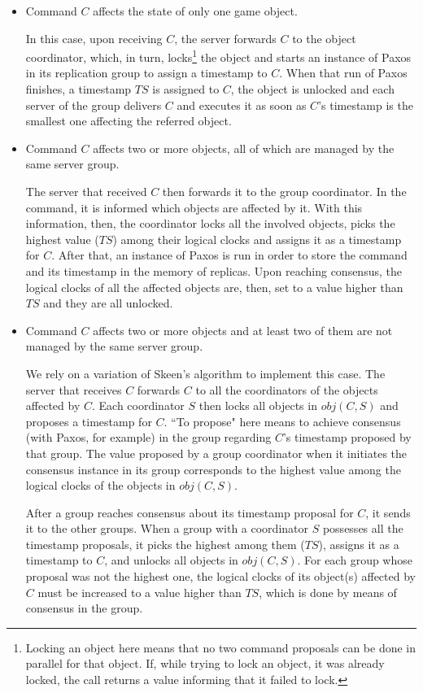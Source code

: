 \documentclass[times, 10pt]{article}
\begin{document}
\begin{itemize}
\item Command $C$ affects the state of only one game object.

In this case, upon receiving $C$, the server forwards $C$ to the object coordinator, which, in turn, locks\footnote{Locking an object here means that no two command proposals can be done in parallel for that object. If, while trying to lock an object, it was already locked, the  call returns a value informing that it failed to lock.} the object and starts an instance of Paxos in its replication group to assign a timestamp to $C$. When that run of Paxos finishes, a timestamp $TS$ is assigned to $C$, the object is unlocked and each server of the group delivers $C$ and executes it as soon as $C$'s timestamp is the smallest one affecting the referred object.

\item Command $C$ affects two or more objects, all of which are managed by the same server group.

The server that received $C$ then forwards it to the group coordinator. In the command, it is informed which objects are affected by it. With this information, then, the coordinator locks all the involved objects, picks the highest value ($TS$) among their logical clocks and assigns it as a timestamp for $C$. After that, an instance of Paxos is run in order to store the command and its timestamp in the memory of replicas. Upon reaching consensus, the logical clocks of all the affected objects are, then, set to a value higher than $TS$ and they are all unlocked.

\item Command $C$ affects two or more objects and at least two of them are not managed by the same server group.


We rely on a variation of Skeen's algorithm to implement this case. The server that receives $C$ forwards $C$ to all the coordinators of the objects affected by $C$. Each coordinator $S$ then locks all objects in $obj(C,S)$ and proposes a timestamp for $C$. ``To propose" here means to achieve consensus (with Paxos, for example) in the group regarding $C$'s timestamp proposed by that group. The value proposed by a group coordinator when it initiates the consensus instance in its group corresponds to the highest value among the logical clocks of the objects in $obj(C,S)$.

After a group reaches consensus about its timestamp proposal for $C$, it sends it to the other groups. When a group with a coordinator $S$ possesses all the timestamp proposals, it picks the highest among them ($TS$), assigns it as a timestamp to $C$, and unlocks all objects in $obj(C,S)$. For each group whose proposal was not the highest one, the logical clocks of its object(s) affected by $C$ must be increased to a value higher than $TS$, which is done by means of consensus in the group.

\end{itemize}
\end{document}
